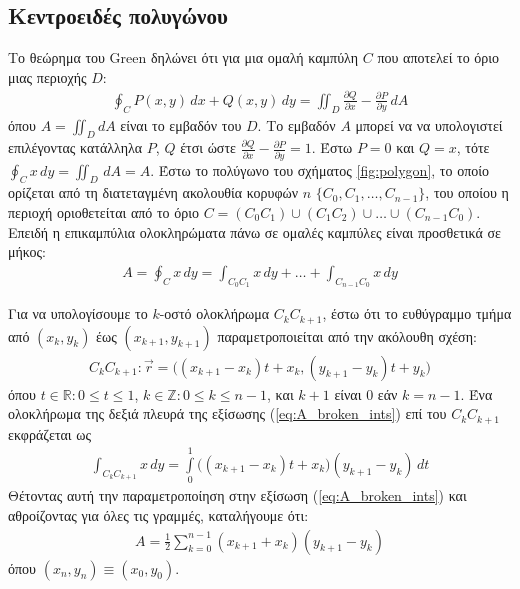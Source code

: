 \subsection{Κεντροειδές πολυγώνου}
\label{subsec:01_01_02_8}

Το θεώρημα του Green \cite{Riemann1851} δηλώνει ότι για μια ομαλή καμπύλη $C$
που αποτελεί το όριο μιας περιοχής $D$:
\begin{align}
  \oint_C P(x,y) \,dx + Q(x,y) \,dy = \iint_D \frac{\partial Q}{\partial x} - \frac{\partial P}{\partial y} \,dA
  \label{eq:green}
\end{align}
όπου $A = \iint_D dA$ είναι το εμβαδόν του $D$. Το εμβαδόν $A$ μπορεί να να
υπολογιστεί επιλέγοντας κατάλληλα $P$, $Q$ έτσι ώστε
$\frac{\partial Q}{\partial x} - \frac{\partial P}{\partial y} = 1$. Έστω
$P=0$ και $Q=x$, τότε $\oint_C x \,dy = \iint_D \,dA = A$. Έστω το πολύγωνο του
σχήματος \ref{fig:polygon}, το οποίο ορίζεται από τη διατεταγμένη ακολουθία
κορυφών $n$ $\{C_0, C_1, \dots, C_{n-1}\}$, του οποίου η περιοχή οριοθετείται
από το όριο $C = (C_0 C_1) \cup (C_1 C_2) \cup \dots \cup (C_{n-1} C_0)$.
Επειδή η επικαμπύλια ολοκληρώματα πάνω σε ομαλές καμπύλες είναι προσθετικά σε
μήκος:
\begin{align}
  A = \oint_C x \,dy = \int_{C_0 C_1} x \,dy + \dots + \int_{C_{n-1} C_0} x \,dy
  \label{eq:A_broken_ints}
\end{align}

Για να υπολογίσουμε το $k$-οστό ολοκλήρωμα $C_k C_{k+1}$, έστω ότι το
ευθύγραμμο τμήμα από $(x_k,y_k)$ έως $(x_{k+1}, y_{k+1})$ παραμετροποιείται από
την ακόλουθη σχέση:
\begin{align}
  C_k C_{k+1} : \vec{r} = \big( (x_{k+1}-x_k)t + x_k, (y_{k+1}-y_k)t + y_k \big)
\end{align}
όπου $t \in \mathbb{R}: 0 \leq t\leq 1$, $k \in \mathbb{Z}: 0 \leq k \leq n-1$,
και $k+1$ είναι $0$ εάν $k=n-1$. Ένα ολοκλήρωμα της δεξιά πλευρά της εξίσωσης
(\ref{eq:A_broken_ints}) επί του $C_k C_{k+1}$ εκφράζεται ως
\begin{align}
  \int_{C_k C_{k+1}} x \,dy = \int\limits_0^1 \big( (x_{k+1}-x_k)t + x_k \big) (y_{k+1}-y_k) \,dt
  \label{eq:A_one_int}
\end{align}
Θέτοντας αυτή την παραμετροποίηση στην εξίσωση (\ref{eq:A_broken_ints}) και
αθροίζοντας για όλες τις γραμμές, καταλήγουμε ότι:
\begin{align}
  A = \frac{1}{2}\sum\limits_{k=0}^{n-1} (x_{k+1} + x_k) (y_{k+1} - y_k)
\label{eq:polygon_area}
\end{align}
όπου $(x_n,y_n) \equiv (x_0, y_0)$.

